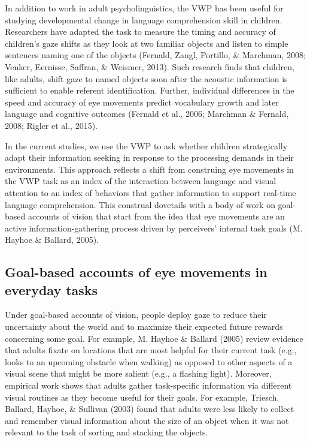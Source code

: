 \documentclass[oneside]{report}
\begin{document}
In addition to work in adult psycholinguistics, the VWP has been useful
for studying developmental change in language comprehension skill in
children. Researchers have adapted the task to measure the timing and
accuracy of children's gaze shifts as they look at two familiar objects
and listen to simple sentences naming one of the objects (Fernald,
Zangl, Portillo, \& Marchman, 2008; Venker, Eernisse, Saffran, \&
Weismer, 2013). Such research finds that children, like adults, shift
gaze to named objects soon after the acoustic information is sufficient
to enable referent identification. Further, individual differences in
the speed and accuracy of eye movements predict vocabulary growth and
later language and cognitive outcomes (Fernald et al., 2006; Marchman \&
Fernald, 2008; Rigler et al., 2015).

In the current studies, we use the VWP to ask whether children
strategically adapt their information seeking in response to the
processing demands in their environments. This approach reflects a shift
from construing eye movements in the VWP task as an index of the
interaction between language and visual attention to an index of
behaviors that gather information to support real-time language
comprehension. This construal dovetails with a body of work on
goal-based accounts of vision that start from the idea that eye
movements are an active information-gathering process driven by
perceivers' internal task goals (M. Hayhoe \& Ballard, 2005).

\subsection{Goal-based accounts of eye movements in everyday
tasks}\label{goal-based-accounts-of-eye-movements-in-everyday-tasks}

Under goal-based accounts of vision, people deploy gaze to reduce their
uncertainty about the world and to maximize their expected future
rewards concerning some goal. For example, M. Hayhoe \& Ballard (2005)
review evidence that adults fixate on locations that are most helpful
for their current task (e.g., looks to an upcoming obstacle when
walking) as opposed to other aspects of a visual scene that might be
more salient (e.g., a flashing light). Moreover, empirical work shows
that adults gather task-specific information via different visual
routines as they become useful for their goals. For example, Triesch,
Ballard, Hayhoe, \& Sullivan (2003) found that adults were less likely
to collect and remember visual information about the size of an object
when it was not relevant to the task of sorting and stacking the
objects.
\end{document}
